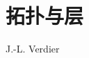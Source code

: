\setcounter{chapter}{1}
\chapter{拓扑与层}
\begin{center}
J.-L. Verdier
\end{center}
\label{sga4.exp.II}

